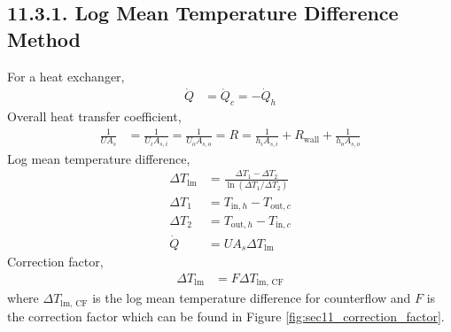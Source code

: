 \begin{multicols*}{2}
\subsection*{11.3.1. Log Mean Temperature Difference Method}
For a heat exchanger,
\begin{align*}
    \dot{Q} &= \dot{Q}_{c} = -\dot{Q}_{h} 
\end{align*}
Overall heat transfer coefficient,
\begin{align*}
    \frac{1}{U A_s} &= \frac{1}{U_i A_{s,i}} = \frac{1}{U_o A_{s,o}} = R = \frac{1}{h_i A_{s,i}} +
    R_{\text{wall}} + \frac{1}{h_o A_{s,o}} 
\end{align*}
Log mean temperature difference,
\begin{align*}
    \Delta T_{\text{lm}} &= \frac{\Delta T_1 - \Delta T_2}{\ln(\Delta T_1 / \Delta T_2)} \\
    \Delta T_1 &= T_{\text{in},h} - T_{\text{out},c} \\
    \Delta T_2 &= T_{\text{out},h} - T_{\text{in},c} \\
    \dot{Q} &= U A_s \Delta T_{\text{lm}} 
\end{align*}
Correction factor,
\begin{align*}
    \Delta T_{\text{lm}} &= F \Delta T_{\text{lm, CF}} 
\end{align*}
where $\Delta T_{\text{lm, CF}}$ is the log mean temperature difference for counterflow and $F$ is the correction factor
which can be found in Figure \ref{fig:sec11_correction_factor}.


\end{multicols*}
